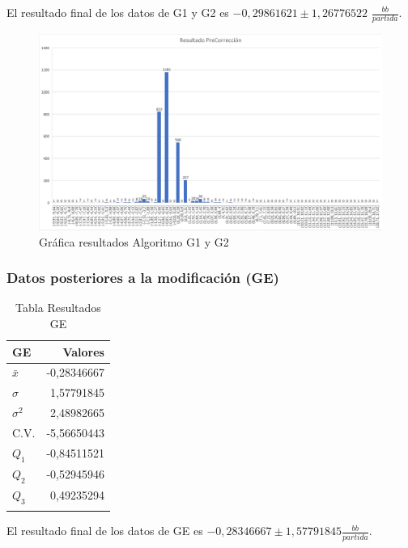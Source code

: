 \vspace{5mm} %

El resultado final de los datos de G1 y G2 es $-0,29861621\pm1,26776522$ $\frac{bb}{partida}$.

\vspace{5mm} %

\begin{figure}[h]
\centering
\includegraphics[width=1.3\textwidth, angle=90]{figuras/AGP.png}   
\caption{Gráfica resultados Algoritmo G1 y G2}
\label{fig:AGP}
\end{figure}


\subsubsection{Datos posteriores a la modificación (GE)}

\begin{longtable}[c]{lr}
\hline
GE & Valores \\ \hline
$\bar{x}$ & -0,28346667 \\ 
$\sigma$ & 1,57791845 \\ 
$\sigma^2$ & 2,48982665 \\ 
C.V. & -5,56650443 \\ 
$Q_1$ & -0,84511521 \\ 
$Q_2$ & -0,52945946 \\ 
$Q_3$ & 0,49235294 \\ \hline
\caption{Tabla Resultados GE}
\label{tab:AGC}
\end{longtable}

\vspace{5mm} %

El resultado final de los datos de GE es $ -0,28346667\pm1,57791845$$\frac{bb}{partida}$.


